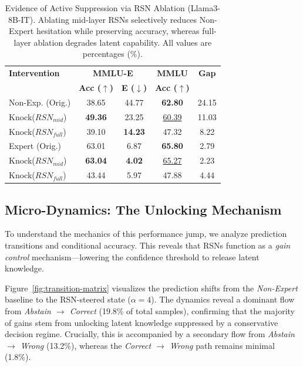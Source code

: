 \documentclass{article}
\begin{document}
\begin{table}[htbp]
\centering
\small
\caption{Evidence of Active Suppression via RSN Ablation (Llama3-8B-IT). Ablating mid-layer RSNs selectively reduces Non-Expert hesitation while preserving accuracy, whereas full-layer ablation degrades latent capability. All values are percentages (\%).}
\label{tab:mechanism-knockout}
\setlength{\tabcolsep}{2.5pt} %
\renewcommand{\arraystretch}{1.15}
\begin{tabular}{l cc c c}
\toprule
\textbf{Intervention} 
& \multicolumn{2}{c}{\textbf{MMLU-E}} 
& \textbf{MMLU} 
& \textbf{Gap} \\
& \textbf{Acc ($\uparrow$)} 
& \textbf{E ($\downarrow$)} 
& \textbf{Acc ($\uparrow$)} 
& \\
\midrule
Non-Exp. (Orig.) 
& 38.65 & 44.77 & \textbf{62.80} & 24.15 \\
Knock($RSN_{mid}$) & \textbf{49.36} & 23.25 & \underline{60.39} & 11.03 \\
Knock($RSN_{full}$) 
& 39.10 & \textbf{14.23} & 47.32 & 8.22 \\
\midrule
Expert (Orig.) 
& 63.01 & 6.87 & \textbf{65.80} & 2.79 \\
Knock($RSN_{mid}$) 
& \textbf{63.04} & \textbf{4.02} & \underline{65.27} & 2.23 \\
Knock($RSN_{full}$) 
& 43.44 & 5.97 & 47.88 & 4.44 \\
\bottomrule
\end{tabular}
\end{table}

\subsection{Micro-Dynamics: The Unlocking Mechanism}
\label{sec:micro-dynamics}
To understand the mechanics of this performance jump, we analyze prediction transitions and conditional accuracy. This reveals that RSNs function as a \emph{gain control} mechanism—lowering the confidence threshold to release latent knowledge.

Figure~\ref{fig:transition-matrix} visualizes the prediction shifts from the \emph{Non-Expert} baseline to the RSN-steered state ($\alpha=4$). The dynamics reveal a dominant flow from \emph{Abstain $\to$ Correct} (19.8\% of total samples), confirming that the majority of gains stem from unlocking latent knowledge suppressed by a conservative decision regime. Crucially, this is accompanied by a secondary flow from \emph{Abstain $\to$ Wrong} (13.2\%), whereas the \emph{Correct $\to$ Wrong} path remains minimal (1.8\%).
\end{document}
